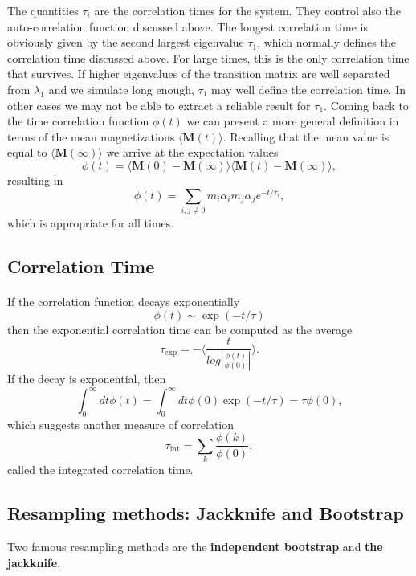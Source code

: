 \documentclass[%
oneside,                 %
final,                   %
10pt]{article}
\begin{document}
The quantities $\tau_i$ are the correlation times for the system. They control also the auto-correlation function 
discussed above.  The longest correlation time is obviously given by the second largest
eigenvalue $\tau_1$, which normally defines the correlation time discussed above. For large times, this is the 
only correlation time that survives. If higher eigenvalues of the transition matrix are well separated from 
$\lambda_1$ and we simulate long enough,  $\tau_1$ may well define the correlation time. 
In other cases we may not be able to extract a reliable result for $\tau_1$. 
Coming back to the time correlation function $\phi(t)$ we can present a more general definition in terms
of the mean magnetizations $ \langle \mathbf{M}(t) \rangle$. Recalling that the mean value is equal 
to $ \langle \mathbf{M}(\infty) \rangle$ we arrive at the expectation values
\[
\phi(t) =\langle \mathbf{M}(0)-\mathbf{M}(\infty)\rangle \langle \mathbf{M}(t)-\mathbf{M}(\infty)\rangle,
\]
resulting in
\[
\phi(t) =\sum_{i,j\ne 0}m_i\alpha_im_j\alpha_je^{-t/\tau_i},
\]
which is appropriate for all times.



\subsection*{Correlation Time}

\paragraph{}

If the correlation function decays exponentially
\[ \phi (t) \sim \exp{(-t/\tau)}\]
then the exponential correlation time can be computed as the average
\[   \tau_{\mathrm{exp}}  =  -\langle  \frac{t}{log|\frac{\phi(t)}{\phi(0)}|} \rangle. \]
If the decay is exponential, then
\[  \int_0^{\infty} dt \phi(t)  = \int_0^{\infty} dt \phi(0)\exp{(-t/\tau)}  = \tau \phi(0),\] 
which  suggests another measure of correlation
\[   \tau_{\mathrm{int}} = \sum_k \frac{\phi(k)}{\phi(0)}, \]
called the integrated correlation time.



\subsection*{Resampling methods: Jackknife and Bootstrap}

Two famous
resampling methods are the \textbf{independent bootstrap} and \textbf{the jackknife}. 
\end{document}
